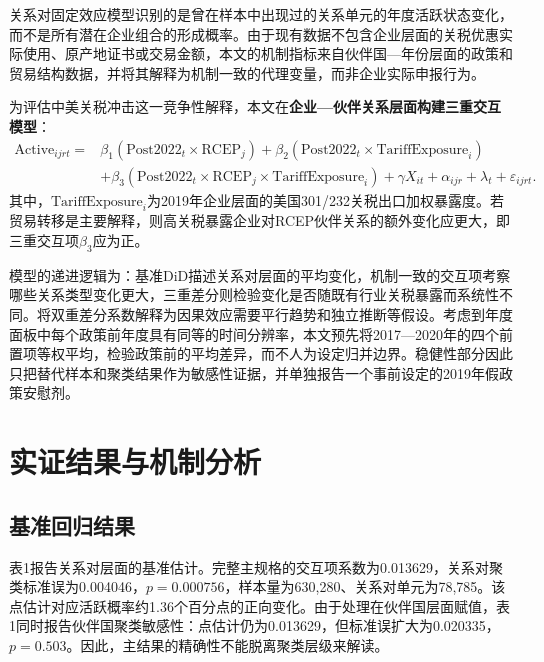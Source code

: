 \documentclass[12pt,a4paper]{ctexart}
\begin{document}
关系对固定效应模型识别的是曾在样本中出现过的关系单元的年度活跃状态变化，而不是所有潜在企业组合的形成概率。由于现有数据不包含企业层面的关税优惠实际使用、原产地证书或交易金额，本文的机制指标来自伙伴国—年份层面的政策和贸易结构数据，并将其解释为机制一致的代理变量，而非企业实际申报行为。

为评估中美关税冲击这一竞争性解释，本文在\textbf{企业—伙伴关系层面构建三重交互模型}：
\begin{equation}\label{eq:ddd}
\begin{aligned}
\text{Active}_{ijrt} ={}& \beta_1(\text{Post2022}_t\times\text{RCEP}_j)
 + \beta_2(\text{Post2022}_t\times\text{TariffExposure}_i)\\
&+ \beta_3(\text{Post2022}_t\times\text{RCEP}_j\times\text{TariffExposure}_i)
 + \gamma X_{it} + \alpha_{ijr} + \lambda_t + \varepsilon_{ijrt}.
\end{aligned}
\end{equation}
其中，$\text{TariffExposure}_i$为2019年企业层面的美国301/232关税出口加权暴露度。若贸易转移是主要解释，则高关税暴露企业对RCEP伙伴关系的额外变化应更大，即三重交互项$\beta_3$应为正。

模型的递进逻辑为：基准DiD描述关系对层面的平均变化，机制一致的交互项考察哪些关系类型变化更大，三重差分则检验变化是否随既有行业关税暴露而系统性不同。将双重差分系数解释为因果效应需要平行趋势和独立推断等假设。考虑到年度面板中每个政策前年度具有同等的时间分辨率，本文预先将2017—2020年的四个前置项等权平均，检验政策前的平均差异，而不人为设定归并边界。稳健性部分因此只把替代样本和聚类结果作为敏感性证据，并单独报告一个事前设定的2019年假政策安慰剂。


\section{实证结果与机制分析}

\subsection{基准回归结果}


表1报告关系对层面的基准估计。完整主规格的交互项系数为0.013629，关系对聚类标准误为0.004046，$p=0.000756$，样本量为630,280、关系对单元为78,785。该点估计对应活跃概率约1.36个百分点的正向变化。由于处理在伙伴国层面赋值，表1同时报告伙伴国聚类敏感性：点估计仍为0.013629，但标准误扩大为0.020335，$p=0.503$。因此，主结果的精确性不能脱离聚类层级来解读。
\end{document}
